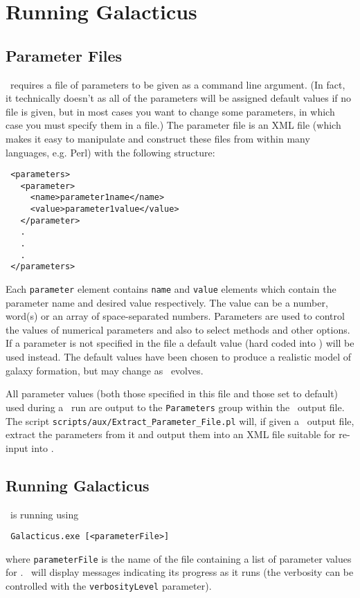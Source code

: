 \chapter{Running Galacticus}

\section{Parameter Files}

\glc\ requires a file of parameters to be given as a command line argument. (In fact, it technically doesn't as all of the parameters will be assigned default values if no file is given, but in most cases you want to change some parameters, in which case you must specify them in a file.) The parameter file is an XML file (which makes it easy to manipulate and construct these files from within many languages, e.g. Perl) with the following structure:
\begin{verbatim}
 <parameters>
   <parameter>
     <name>parameter1name</name>
     <value>parameter1value</value>
   </parameter>
   .
   .
   .
 </parameters>
\end{verbatim}
Each {\tt parameter} element contains {\tt name} and {\tt value} elements which contain the parameter name and desired value respectively. The value can be a number, word(s) or an array of space-separated numbers. Parameters are used to control the values of numerical parameters and also to select methods and other options. If a parameter is not specified in the file a default value (hard coded into \glc) will be used instead. The default values have been chosen to produce a realistic model of galaxy formation, but may change as \glc\ evolves.

All parameter values (both those specified in this file and those set to default) used during a \glc\ run are output to the {\tt Parameters} group within the \glc\ output file. The script {\tt scripts/aux/Extract\_Parameter\_File.pl} will, if given a \glc\ output file, extract the parameters from it and output them into an XML file suitable for re-input into \glc.

\section{Running Galacticus}

\glc\ is running using
\begin{verbatim}
 Galacticus.exe [<parameterFile>]
\end{verbatim}
where {\tt parameterFile} is the name of the file containing a list of parameter values for \glc. \glc\ will display messages indicating its progress as it runs (the verbosity can be controlled with the {\tt verbosityLevel} parameter).

